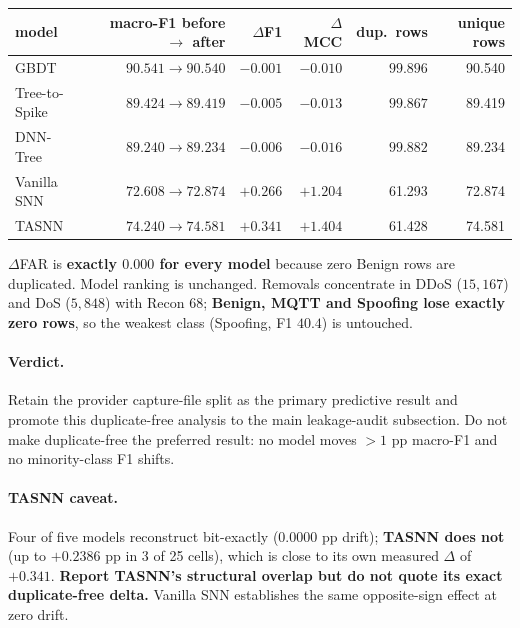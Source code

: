 \begin{center}\small
\begin{tabular}{lrrrrr}\toprule
model & macro-F1 before $\rightarrow$ after & $\Delta$F1 & $\Delta$MCC & dup.\ rows &
unique rows \\\midrule
GBDT          & $90.541 \rightarrow 90.540$ & $-0.001$ & $-0.010$ & $\mathbf{99.896}$ & 90.540 \\
Tree-to-Spike & $89.424 \rightarrow 89.419$ & $-0.005$ & $-0.013$ & $\mathbf{99.867}$ & 89.419 \\
DNN-Tree      & $89.240 \rightarrow 89.234$ & $-0.006$ & $-0.016$ & $\mathbf{99.882}$ & 89.234 \\
Vanilla SNN   & $72.608 \rightarrow 72.874$ & $+0.266$ & $\mathbf{+1.204}$ & 61.293 & 72.874 \\
TASNN         & $74.240 \rightarrow 74.581$ & $+0.341$ & $\mathbf{+1.404}$ & 61.428 & 74.581 \\
\bottomrule\end{tabular}\end{center}

\noindent$\Delta$FAR is \textbf{exactly $0.000$ for every model} because zero Benign rows
are duplicated. Model ranking is unchanged. Removals concentrate in DDoS ($15{,}167$) and
DoS ($5{,}848$) with Recon $68$; \textbf{Benign, MQTT and Spoofing lose exactly zero rows},
so the weakest class (Spoofing, F1 $40.4$) is untouched.

\paragraph{Verdict.} Retain the provider capture-file split as the primary predictive
result and promote this duplicate-free analysis to the main leakage-audit subsection. Do
not make duplicate-free the preferred result: no model moves $>1$ pp macro-F1 and no
minority-class F1 shifts.

\paragraph{TASNN caveat.} Four of five models reconstruct bit-exactly (0.0000 pp drift);
\textbf{TASNN does not} (up to $+0.2386$ pp in 3 of 25 cells), which is close to its own
measured $\Delta$ of $+0.341$. \textbf{Report TASNN's structural overlap but do not quote
its exact duplicate-free delta.} Vanilla SNN establishes the same opposite-sign effect at
zero drift.

